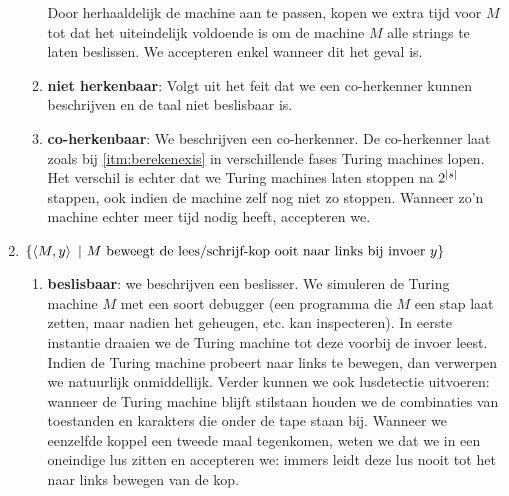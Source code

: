 \documentclass{article}
\begin{document}
\begin{question}[Berekenbaarheid]
\begin{answer}
\begin{enumerate}
\begin{enumerate}
\begin{quote}
  \end{quote}
  Door herhaaldelijk de machine aan te passen, kopen we extra tijd voor $M$ tot dat het uiteindelijk voldoende is om de machine $M$ alle strings te laten beslissen. We accepteren enkel wanneer dit het geval is.
  \item \textbf{niet herkenbaar}: Volgt uit het feit dat we een co-herkenner kunnen beschrijven en de taal niet beslisbaar is.
  \item \textbf{co-herkenbaar}: We beschrijven een co-herkenner. De co-herkenner laat zoals bij \ref{itm:berekenexis} in verschillende fases Turing machines lopen. Het verschil is echter dat we Turing machines laten stoppen na $2^{\left|s\right|}$ stappen, ook indien de machine zelf nog niet zo stoppen. Wanneer zo'n machine echter meer tijd nodig heeft, accepteren we.
 \end{enumerate}
 \item $\left\{ \left\langle M,y \right\rangle\ |\ \mbox{$M$ beweegt de lees/schrijf-kop ooit naar links bij invoer $y$} \right\}$
 \begin{enumerate}
  \item \textbf{beslisbaar}: we beschrijven een beslisser. We simuleren de Turing machine $M$ met een soort debugger (een programma die $M$ een stap laat zetten, maar nadien het geheugen, etc. kan inspecteren). In eerste instantie draaien we de Turing machine tot deze voorbij de invoer leest. Indien de Turing machine probeert naar links te bewegen, dan verwerpen we natuurlijk onmiddellijk. Verder kunnen we ook lusdetectie uitvoeren: wanneer de Turing machine blijft stilstaan houden we de combinaties van toestanden en karakters die onder de tape staan bij. Wanneer we eenzelfde koppel een tweede maal tegenkomen, weten we dat we in een oneindige lus zitten en accepteren we: immers leidt deze lus nooit tot het naar links bewegen van de kop.

\end{enumerate}
\end{enumerate}
\end{answer}
\end{question}
\end{document}
